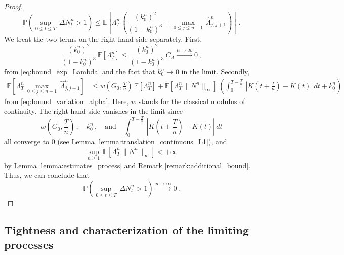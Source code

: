 \documentclass{article}
\newcommand{\1}{\mathbbm{1}}
\numberwithin{equation}{section}
\begin{document}
\begin{proof}
    $$
    \mathbb P \left(\sup_{0 \leq t \leq T}\,\Delta N^n_t > 1 \right) \leq \mathbb E \left[\Lambda^n_T\, \left(\frac{\left(k_0^n\right)^2}{\left(1 - k_0^n\right)^3} + \max_{0 \leq j \leq n-1}\, \widehat \Lambda^n_{j,j+1} \right) \right] \,.
    $$
    We treat the two terms on the right-hand side separately. First, 
    $$
    \frac{\left(k_0^n\right)^2}{\left(1 - k_0^n\right)^3}\, \mathbb E \left[\Lambda^n_T \right] \leq \frac{\left(k_0^n\right)^2}{\left(1 - k_0^n\right)^3}\, C_{\Lambda} \overset{n \to \infty}{\longrightarrow} 0\,,
    $$
    from \eqref{eq:bound_exp_Lambda} and the fact that $k_0^n \to 0$ in the limit. Secondly,
    \begin{align*}
        \mathbb E \left[\Lambda^n_T\, \max_{0 \leq j \leq n-1}\,\widehat \Lambda^n_{j,j+1}\right] &\leq w\left(G_0,\frac{T}{n}\right)\,\mathbb E \left[\Lambda^n_T\right] + \mathbb E \left[\Lambda^n_T\, \|N^n\|_{\infty}\right]\,\left(\int_0^{T-\frac{T}{n}}\,\left|K\left(t + \frac{T}{n}\right) - K(t)\right| \,dt + k_0^n\right)
    \end{align*}
    from \eqref{eq:bound_variation_alpha}. Here, $w$ stands for the classical modulus of continuity. The right-hand side vanishes in the limit since 
    $$
    w\left(G_0, \frac{T}{n}\right)\,, \quad k_0^n\,, \quad \text{and}\quad  \int_{0}^{T - \frac{T}{n}}\,\left|K\left(t+\frac{T}{n}\right) - K(t)\right|\,dt
    $$
    all converge to $0$ (see Lemma \ref{lemma:translation_continuous_L1}), and
    $$
    \sup_{n \geq 1}\,\mathbb E \left[ \Lambda^n_T\, \|N^n\|_{\infty}\right] < + \infty
    $$
    by Lemma \ref{lemma:estimates_process} and Remark \ref{remark:additional_bound}.
    Thus, we can conclude that
    $$
    \mathbb P \left(\sup_{0 \leq t \leq T}\, \Delta N^n_t > 1 \right) \overset{n \to \infty}{\longrightarrow} 0\,.
    $$
\end{proof}

\subsection{Tightness and characterization of the limiting processes}
\end{document}
